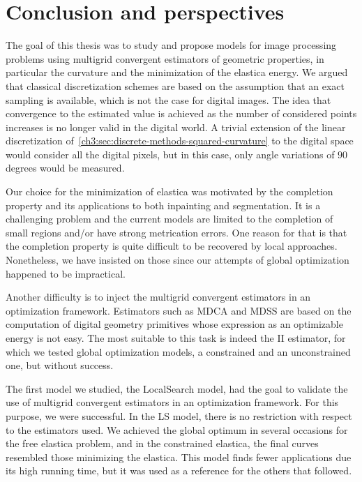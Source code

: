 \chapter{Conclusion and perspectives}
\label{chapter:conclusion-and-perspectives}

The goal of this thesis was to study and propose models for image processing problems using multigrid convergent estimators of geometric properties, in particular the curvature and the minimization of the elastica energy. We argued that classical discretization schemes are based on the assumption that an exact sampling is available, which is not the case for digital images. The idea that convergence to the estimated value is achieved as the number of considered points increases is no longer valid in the digital world. A trivial extension of the linear discretization of~\cref{ch3:sec:discrete-methods-squared-curvature} to the digital space would consider all the digital pixels, but in this case, only angle variations of $90$ degrees would be measured.

Our choice for the minimization of elastica was motivated by the completion property and its applications to both inpainting and segmentation. It is a challenging problem and the current models are limited to the completion of small regions and/or have strong metrication errors. One reason for that is that the completion property is quite difficult to be recovered by local approaches. Nonetheless, we have insisted on those since our attempts of global optimization happened to be impractical.

Another difficulty is to inject the multigrid convergent estimators in an optimization framework. Estimators such as MDCA and MDSS are based on the computation of digital geometry primitives whose expression as an optimizable energy is not easy. The most suitable to this task is indeed the II estimator, for which we tested global optimization models, a constrained and an unconstrained one, but without success.

The first model we studied, the LocalSearch model, had the goal to validate the use of  multigrid convergent estimators in an optimization framework. For this purpose, we were successful. In the LS model, there is no restriction with respect to the estimators used. We achieved the global optimum in several occasions for the free elastica problem, and in the constrained elastica, the final curves resembled those minimizing the elastica. This model finds fewer applications due its high running time, but it was used as a reference for the others that followed.

